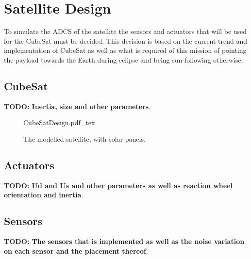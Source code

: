 \chapter{Satellite Design}
\label{chap:SatDesign}
To simulate the ADCS of the satellite the sensors and actuators that will be used for the CubeSat must be decided. This decision is based on the current trend and implementation of CubeSat as well as what is required of this mission of pointing the payload towards the Earth during eclipse and being sun-following otherwise.


\section{CubeSat}
\textbf{TODO: Inertia, size and other parameters}.

\begin{figure}[h!t!b]
	\centering
	\def\svgwidth{14cm}
	{CubeSatDesign.pdf_tex}
	\caption{The modelled satellite, with solar panels.}
	\label{fig:CubeSatDesign}
\end{figure}

\section{Actuators}
\textbf{TODO: Ud and Us and other parameters as well as reaction wheel orientation and inertia}.

\section{Sensors}
\textbf{TODO: The sensors that is implemented as well as the noise variation on each sensor and the placement thereof}.